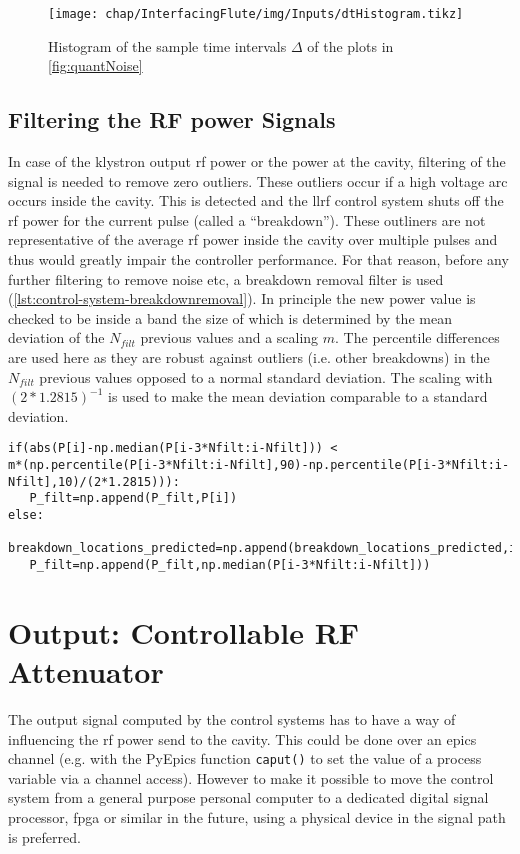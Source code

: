 \begin{figure}[tb]
\centering
\texttt{[image: chap/InterfacingFlute/img/Inputs/dtHistogram.tikz]}
\caption{Histogram of the sample time intervals $\Delta$ of the plots in \autoref{fig:quantNoise}}
\label{fig:interfacingFlute_sampleTimesHist}
\end{figure}

\subsection{Filtering the RF power Signals}
In case of the klystron output \gls{rf} power or the power at the cavity, filtering of the signal is needed to remove zero outliers.
These outliers occur if a high voltage arc occurs inside the cavity. This is detected and the \gls{llrf} control system shuts off the \gls{rf} power for the current pulse (called a ``breakdown'').
These outliners are not representative of the average \gls{rf} power inside the cavity over multiple pulses and thus would greatly impair the controller performance.
For that reason, before any further filtering to remove noise etc, a breakdown removal filter is used (\autoref{lst:control-system-breakdownremoval}).
In principle the new power value is checked to be inside a band the size of which is determined by the mean deviation of the $N_{filt}$ previous values and a scaling $m$.
The percentile differences are used here as they are robust against outliers (i.e. other breakdowns) in the $N_{filt}$ previous values opposed to a normal standard deviation.
The scaling with $(2*1.2815)^{-1}$ is used to make the mean deviation comparable to a standard deviation.

\begin{lstlisting}[style=python,caption = Breakdown removal filtering, label = lst:control-system-breakdownremoval]
if(abs(P[i]-np.median(P[i-3*Nfilt:i-Nfilt])) <
m*(np.percentile(P[i-3*Nfilt:i-Nfilt],90)-np.percentile(P[i-3*Nfilt:i-Nfilt],10)/(2*1.2815))):
   P_filt=np.append(P_filt,P[i])
else:
   breakdown_locations_predicted=np.append(breakdown_locations_predicted,i)
   P_filt=np.append(P_filt,np.median(P[i-3*Nfilt:i-Nfilt]))
\end{lstlisting}





\section{Output: Controllable RF Attenuator}\label{sec:atteneval}
The output signal computed by the control systems has to have a way of influencing the \gls{rf} power send to the cavity. This could be done over an \gls{epics} channel (e.g. with the PyEpics function \texttt{caput()} to set the value of a process variable via a channel access). However to make it possible to move the control system from a general purpose personal computer to a dedicated digital signal processor, \gls{fpga} or similar in the future, using a physical device in the signal path is preferred.\\


